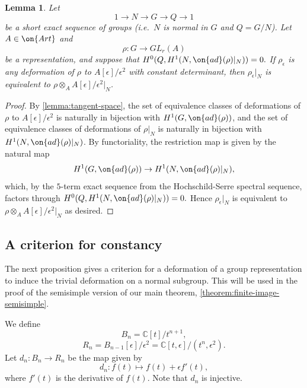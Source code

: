 \documentclass[12 pt]{amsart}
\theoremstyle{plain}
\newtheorem{lemma}[subsubsection]{Lemma}
\theoremstyle{definition}
\theoremstyle{remark}
\numberwithin{equation}{section}
\begin{document}
\begin{lemma}\label{lemma:split-constancy}
	Let $$1\to N\to G\to Q\to 1$$ be a short exact sequence of groups (i.e.~$N$ is normal in $G$ and $Q=G/N$). Let $A\in\on{Art}$ and $$\rho: G\to GL_r(A)$$ be a representation, and suppose that $H^0(Q, H^1(N, \on{ad}(\rho)|_N))=0.$ If $\rho_\epsilon$ is any deformation of $\rho$ to $A[\epsilon]/\epsilon^2$ with constant determinant, then $\rho_\epsilon|_N$ is equivalent to $\rho\otimes_A A[\epsilon]/\epsilon^2|_N$.
\end{lemma}
\begin{proof}
	By \autoref{lemma:tangent-space}, the set of equivalence classes of deformations of $\rho$ to $A[\epsilon]/\epsilon^2$ is naturally in bijection with $H^1(G, \on{ad}(\rho))$, and the set of equivalence classes of deformations of $\rho|_N$ is naturally in bijection with $H^1(N, \on{ad}(\rho)|_N)$. By functoriality, the restriction map is given by the natural map $$H^1(G, \on{ad}(\rho))\to H^1(N, \on{ad}(\rho)|_N),$$ which, by the $5$-term exact sequence from the Hochschild-Serre spectral sequence, factors through $H^0(Q, H^1(N, \on{ad}(\rho)|_N))=0.$ Hence $\rho_\epsilon|_N$ is equivalent to $\rho\otimes_A A[\epsilon]/\epsilon^2|_N$ as desired.
\end{proof}

\subsection{A criterion for constancy}
The next proposition gives a criterion for a deformation of a group representation to induce the trivial deformation on a normal subgroup.
This will be used in the proof of the semisimple version of our main theorem,
\autoref{theorem:finite-image-semisimple}.

We define  $$B_n=\mathbb{C}[t]/t^{n+1},$$ $$R_n=B_{n-1}[\epsilon]/\epsilon^2=\mathbb{C}[t, \epsilon]/(t^n,\epsilon^2).$$ Let $d_n: B_n\to R_{n}$ be the map given by $$d_n: f(t)\mapsto f(t)+\epsilon f'(t),$$ where $f'(t)$ is the derivative of $f(t)$. Note that $d_n$ is injective.
\end{document}

